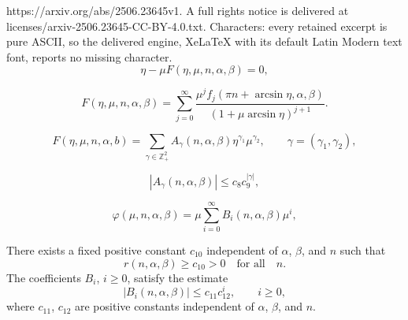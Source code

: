 \documentclass[10pt,a4paper]{amsart}
\def\a{\alpha}
\def\b{\beta}
\begin{document}
https://arxiv.org/abs/2506.23645v1. A full rights notice is delivered at licenses/arxiv-2506.23645-CC-BY-4.0.txt. Characters: every retained excerpt is pure ASCII, so the delivered engine, XeLaTeX with its default Latin Modern text font, reports no missing character.
\begin{equation}\label{equateta}
\eta-\mu F(\eta, \mu, n,\a,\b)=0,
\end{equation}

\begin{equation}\label{eqmaineta}
F(\eta, \mu, n,\a,\b)=\sum\limits_{j=0}^{\infty}
\frac{\mu^j f_j (\pi n+\arcsin\eta,\a,\b)}{(1+\mu\arcsin\eta)^{j+1}}.
\end{equation}

\begin{equation}\label{4.16}
F (\eta, \mu, n,\a,b)=\sum\limits_{\gamma\in\mathds{Z}_+^2}A_\gamma(n,\a,\b)\eta^{\gamma_1}
\mu^{\gamma_2}, \qquad \gamma=(\gamma_1, \gamma_2),
\end{equation}

\begin{equation}\label{estAgamma}
|A_\gamma(n,\a,\b)|\leqslant c_{8}c_{9}^{|\gamma|},
\end{equation}

\begin{equation}\label{varphiseries}
\varphi(\mu, n,\a,\b)=\mu\sum\limits_{i=0}^\infty B_i(n,\a,\b)\mu^i,
\end{equation}

\begin{lemma}\label{lm4.3}
There exists a fixed positive constant $c_{10}$   independent of $\alpha$, $\beta$, and $n$ such that
$$
r(n,\a,\b)\geqslant c_{10}>0\quad \text{for all}\quad n.
$$
The coefficients $B_i$, $i\geqslant 0$, satisfy the estimate
\begin{equation}\label{4.24**}
|B_i(n,\a,\b)|\leqslant c_{11} c_{12}^i,\qquad i\geqslant 0,
\end{equation}
where $c_{11}$, $c_{12}$ are positive constants independent of $\alpha$, $\beta$, and $n$.
\end{lemma}
\end{document}
